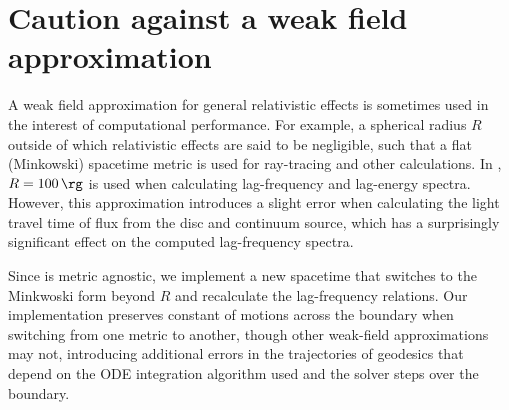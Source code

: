 \section{Caution against a weak field approximation}
\label{appendix:continuum-time}

A weak field approximation for general relativistic effects is sometimes used in the interest of computational performance. For example, a spherical radius $R$ outside of which relativistic effects are said to be negligible, such that a flat (Minkowski) spacetime metric is used for ray-tracing and other calculations. In \citet{cackett_modelling_2014}, $R = 100\, \rg$ is used when calculating lag-frequency and lag-energy spectra. However, this approximation introduces a slight error when calculating the light travel time of flux from the disc and continuum source, which has a surprisingly significant effect on the computed lag-frequency spectra.

Since \Gradus is metric agnostic, we implement a new spacetime that switches to the Minkwoski form beyond $R$ and recalculate the lag-frequency relations. Our implementation preserves constant of motions across the boundary when switching from one metric to another, though other weak-field approximations may not, introducing additional errors in the trajectories of geodesics that depend on the ODE integration algorithm used and the solver steps over the boundary.



